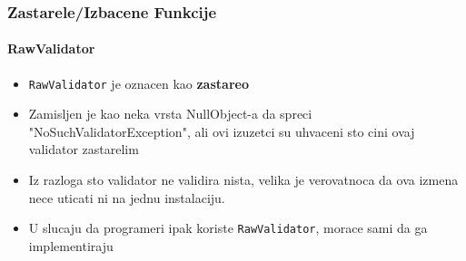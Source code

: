 %
%
%
%
%
%
%
%
%


\begin{frame}[fragile]
	\frametitle{Zastarele/Izbacene Funkcije}
	\framesubtitle{RawValidator}

	\begin{itemize}
		\item \texttt{RawValidator} je oznacen kao  \textbf{zastareo}
		\item Zamisljen je kao neka vrsta NullObject-a da spreci "NoSuchValidatorException",
			ali ovi izuzetci su uhvaceni sto cini ovaj validator zastarelim
		\item Iz razloga sto validator ne validira nista,
			velika je verovatnoca da ova izmena nece uticati ni na jednu instalaciju.
		\item U slucaju da programeri ipak koriste \texttt{RawValidator}, morace sami da ga implementiraju
	\end{itemize}


\end{frame}

